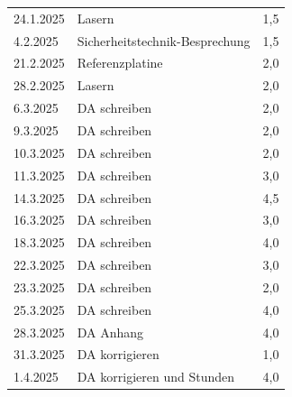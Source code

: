 \begin{longtable}{|l|p{10cm}|r|}
    24.1.2025	&	Lasern	&	1,5	\\
    4.2.2025	&	Sicherheitstechnik-Besprechung	&	1,5	\\
    21.2.2025	&	Referenzplatine	&	2,0	\\
    28.2.2025	&	Lasern	&	2,0	\\
    6.3.2025	&	DA schreiben	&	2,0	\\
    9.3.2025	&	DA schreiben	&	2,0	\\
    10.3.2025	&	DA schreiben	&	2,0	\\
    11.3.2025	&	DA schreiben	&	3,0	\\
    14.3.2025	&	DA schreiben	&	4,5	\\
    16.3.2025	&	DA schreiben	&	3,0	\\
    18.3.2025	&	DA schreiben	&	4,0	\\
    22.3.2025	&	DA schreiben	&	3,0	\\
    23.3.2025	&	DA schreiben	&	2,0	\\
    25.3.2025	&	DA schreiben	&	4,0	\\
    28.3.2025	&	DA Anhang	&	4,0	\\
    31.3.2025	&	DA korrigieren	&	1,0	\\
    1.4.2025	&	DA korrigieren und Stunden	&	4,0	\\
    
\end{longtable}